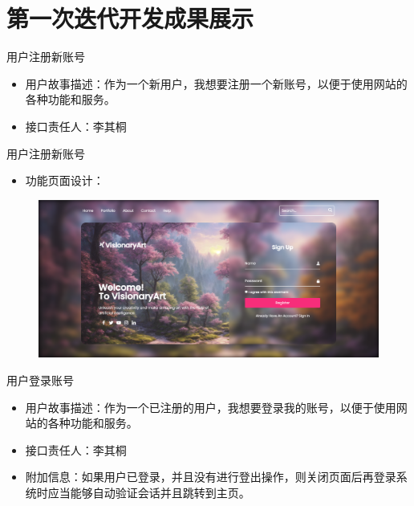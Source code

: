 \section{第一次迭代开发成果展示}
\begin{frame}{用户注册新账号}
    \begin{itemize}
        \item 用户故事描述：作为一个新用户，我想要注册一个新账号，以便于使用网站的各种功能和服务。
        \item 接口责任人：李其桐
    \end{itemize}
\end{frame}

\begin{frame}{用户注册新账号}
    \begin{itemize}
        \item 功能页面设计：
    \end{itemize}
    \begin{figure}[H]
        \centering
        \includegraphics[width=\textwidth]{contents/figure/register.png}
    \end{figure}
\end{frame}

\begin{frame}{用户登录账号}
    \begin{itemize}
        \item 用户故事描述：作为一个已注册的用户，我想要登录我的账号，以便于使用网站的各种功能和服务。
        \item 接口责任人：李其桐
        \item 附加信息：如果用户已登录，并且没有进行登出操作，则关闭页面后再登录系统时应当能够自动验证会话并且跳转到主页。
    \end{itemize}
\end{frame}


